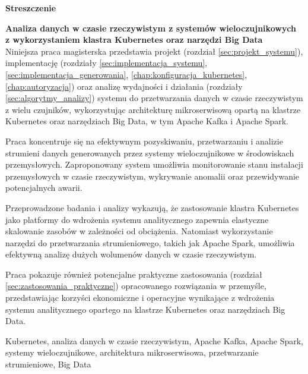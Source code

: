 \begin{abstract_pl}
\begin{center}
\textbf{\large Streszczenie}
\end{center}
\vspace{0.5em}

 \textbf{Analiza danych w czasie rzeczywistym z systemów wieloczujnikowych \\ z wykorzystaniem klastra Kubernetes oraz narzędzi Big Data}\\

Niniejsza praca magisterska przedstawia projekt (rozdział \ref{sec:projekt_systemu}), implementację (rozdziały \ref{sec:implementacja_systemu}, \ref{sec:implementacja_generowania}, \ref{chap:konfiguracja_kubernetes}, \ref{chap:autoryzacja}) oraz analizę wydajności i działania (rozdziały \ref{sec:algorytmy_analizy}) systemu do przetwarzania danych w czasie rzeczywistym z wielu czujników, wykorzystując architekturę mikroserwisową opartą na klastrze Kubernetes oraz narzędziach Big Data, w tym Apache Kafka i Apache Spark.

Praca koncentruje się na efektywnym pozyskiwaniu, przetwarzaniu i analizie strumieni danych generowanych przez systemy wieloczujnikowe w środowiskach przemysłowych. Zaproponowany system umożliwia monitorowanie stanu instalacji przemysłowych w czasie rzeczywistym, wykrywanie anomalii oraz przewidywanie potencjalnych awarii.

Przeprowadzone badania i analizy wykazują, że zastosowanie klastra Kubernetes jako platformy do wdrożenia systemu analitycznego zapewnia elastyczne skalowanie zasobów w zależności od obciążenia. Natomiast wykorzystanie narzędzi do przetwarzania strumieniowego, takich jak Apache Spark, umożliwia efektywną analizę dużych wolumenów danych w czasie rzeczywistym.

Praca pokazuje również potencjalne praktyczne zastosowania (rozdział \ref{sec:zastosowania_praktyczne}) opracowanego rozwiązania w przemyśle, przedstawiając korzyści ekonomiczne i operacyjne wynikające z wdrożenia systemu analitycznego opartego na klastrze Kubernetes oraz narzędziach Big Data.

\begin{keywords}
Kubernetes, analiza danych w czasie rzeczywistym, Apache Kafka, Apache Spark, systemy wieloczujnikowe, architektura mikroserwisowa, przetwarzanie strumieniowe, Big Data
\end{keywords}
\end{abstract_pl}